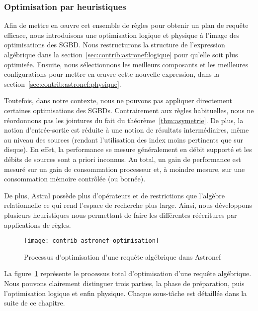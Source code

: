 \subsubsection{Optimisation par heuristiques}
Afin de mettre en œuvre cet ensemble de règles pour obtenir un plan de requête efficace, nous introduisons une optimisation logique et physique à l'image des optimisations des SGBD. Nous restructurons la structure de l'expression algébrique dans la section~\ref{sec:contrib:astronef:logique} pour qu'elle soit plus optimisée. Ensuite, nous sélectionnons les meilleurs composants et les meilleures configurations pour mettre en œuvre cette nouvelle expression, dans la section~\ref{sec:contrib:astronef:physique}.

Toutefois, dans notre contexte, nous ne pouvons pas appliquer directement certaines optimisations des SGBDs. Contrairement aux règles habituelles, nous ne réordonnons pas les jointures du fait du théorème~\ref{thm:asymetrie}. De plus, la notion d'entrée-sortie est réduite à une notion de résultats intermédiaires, même au niveau des sources (rendant l'utilisation des index moins pertinents que sur disque). En effet, la performance se mesure généralement en débit supporté et les débits de sources sont a priori inconnus. Au total, un gain de performance est mesuré sur un gain de consommation processeur et, à moindre mesure, sur une consommation mémoire contrôlée (ou bornée).

De plus, Astral possède plus d'opérateurs et de restrictions que l'algèbre relationnelle ce qui rend l'espace de recherche plus large. Ainsi, nous développons plusieurs heuristiques nous permettant de faire les différentes réécritures par applications de règles.

\begin{figure}[ht]
	\centering
	\texttt{[image: contrib-astronef-optimisation]}
	\caption{Processus d'optimisation d'une requête algébrique dans Astronef}\label{fig:contrib:astronef:optimisation}
\end{figure}
La figure~\ref{fig:contrib:astronef:optimisation} représente le processus total d'optimisation d'une requête algébrique. Nous pouvons clairement distinguer trois parties, la phase de préparation, puis l'optimisation logique et enfin physique. Chaque sous-tâche est détaillée dans la suite de ce chapitre.

